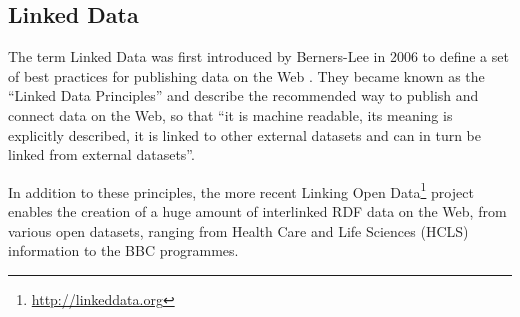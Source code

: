 \subsection{Linked Data}
\label{sec:ld}

The term Linked Data was first introduced by Berners-Lee in 2006 to define a set of best practices for publishing data on the Web \cite{BernersLee2006}. They became known as the ``Linked Data Principles'' and describe the recommended way to publish and connect data on the Web, so that ``it is machine readable, its meaning is explicitly described, it is linked to other external datasets and can in turn be linked from external datasets''.

In addition to these principles, the more recent Linking Open Data\footnote{\url{http://linkeddata.org}} project enables the creation of a huge amount of interlinked RDF data on the Web, from various open datasets, ranging from Health Care and Life Sciences (HCLS) information to the BBC programmes. 
